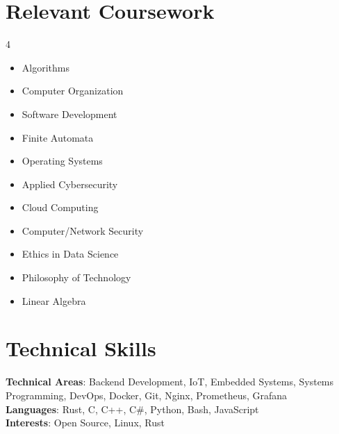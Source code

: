\documentclass[letterpaper, 11pt]{article}
\begin{document}
	\section{Relevant Coursework}
	\begin{multicols}{4}
		{\small \begin{itemize}[itemsep=-5pt, parsep=3pt]\item Algorithms

		\item Computer Organization

		\item Software Development

		\item Finite Automata

		\item Operating Systems

		\item Applied Cybersecurity

		\item Cloud Computing

		\item Computer/Network Security

		\item Ethics in Data Science

		\item Philosophy of Technology

		\item Linear Algebra

		\end{itemize} }
	\end{multicols}
	\vspace*{2.0\multicolsep}

	\section{Technical Skills}
	\begin{itemize}[leftmargin=0.15in, label={}]
		\small{\item{ \textbf{Technical Areas}{: Backend Development, IoT, Embedded Systems, Systems Programming, DevOps, Docker, Git, Nginx, Prometheus, Grafana} \\ \textbf{Languages}{: Rust, C, C++, C\#, Python, Bash, JavaScript} \\ \textbf{Interests}{: Open Source, Linux, Rust} }}
	\end{itemize}
\end{document}

